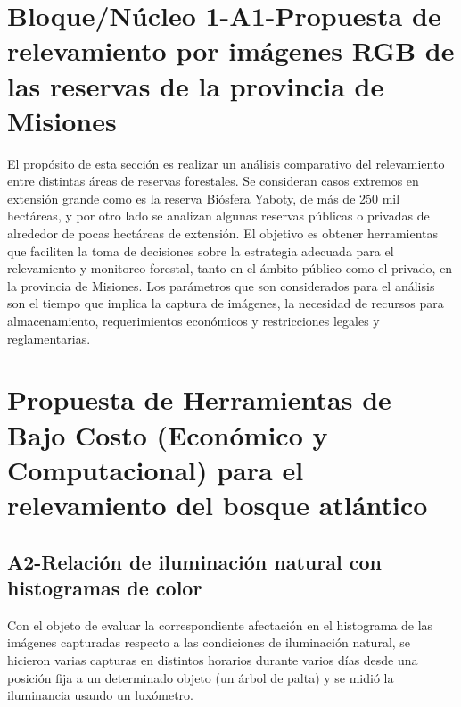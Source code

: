 

\section {Bloque/Núcleo 1-A1-Propuesta de relevamiento por imágenes RGB de las reservas de la provincia de Misiones}
El propósito de esta sección es realizar un análisis comparativo del relevamiento entre distintas áreas de reservas forestales. Se consideran casos extremos en extensión grande como es la reserva Biósfera Yaboty, de más de 250 mil hectáreas, y por otro lado se analizan algunas reservas públicas o privadas de alrededor de pocas hectáreas de extensión. El objetivo es obtener herramientas que faciliten la toma de decisiones sobre la estrategia adecuada para el relevamiento y monitoreo forestal, tanto en el ámbito público como el privado, en la provincia de Misiones. Los parámetros que son considerados para el análisis son el tiempo que implica la captura de imágenes, la necesidad de recursos para almacenamiento, requerimientos económicos y restricciones legales y reglamentarias.


\section{ Propuesta de Herramientas de Bajo Costo (Económico y Computacional) para el relevamiento del bosque atlántico}
\subsection{A2-Relación de iluminación natural con histogramas de color}
Con el objeto de evaluar la correspondiente afectación en el histograma de las imágenes capturadas respecto a las condiciones de iluminación natural, se hicieron varias capturas en distintos horarios durante varios días desde una posición fija a un determinado objeto (un árbol de palta) y se midió la iluminancia usando un luxómetro.
